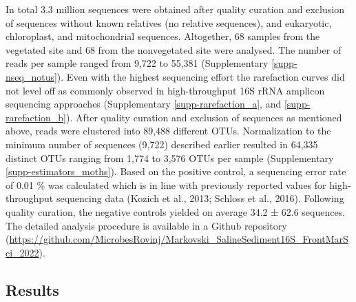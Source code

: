 \documentclass[12pt,]{article}
\begin{document}
In total 3.3 million sequences were obtained after quality curation and
exclusion of sequences without known relatives (no relative sequences),
and eukaryotic, chloroplast, and mitochondrial sequences. Altogether, 68
samples from the vegetated site and 68 from the nonvegetated site were
analysed. The number of reads per sample ranged from 9,722 to 55,381
(Supplementary \autoref{supp-nseq_notus}). Even with the highest
sequencing effort the rarefaction curves did not level off as commonly
observed in high-throughput 16S rRNA amplicon sequencing approaches
(Supplementary \autoref{supp-rarefaction_a}, and
\ref{supp-rarefaction_b}). After quality curation and exclusion of
sequences as mentioned above, reads were clustered into 89,488 different
OTUs. Normalization to the minimum number of sequences (9,722) described
earlier resulted in 64,335 distinct OTUs ranging from 1,774 to 3,576
OTUs per sample (Supplementary \autoref{supp-estimators_moths}). Based
on the positive control, a sequencing error rate of 0.01 \si{\percent}
was calculated which is in line with previously reported values for
high-throughput sequencing data (Kozich et al., 2013; Schloss et al.,
2016). Following quality curation, the negative controls yielded on
average 34.2 ± 62.6 sequences. The detailed analysis procedure is
available in a Github repository
(\url{https://github.com/MicrobesRovinj/Markovski_SalineSediment16S_FrontMarSci_2022}).

\newpage

\hypertarget{results}{%
\subsection{Results}\label{results}}
\end{document}
